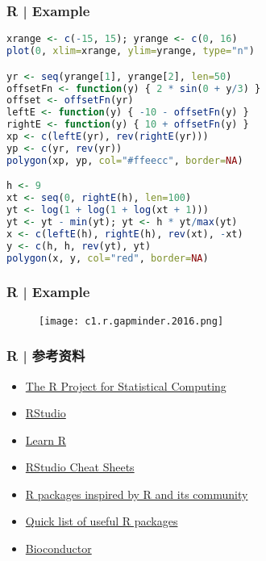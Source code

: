 \begin{frame}[fragile]
  \frametitle{R | Example}
\begin{lstlisting}[language=R,basicstyle=\footnotesize\tt]
xrange <- c(-15, 15); yrange <- c(0, 16)
plot(0, xlim=xrange, ylim=yrange, type="n")

yr <- seq(yrange[1], yrange[2], len=50)
offsetFn <- function(y) { 2 * sin(0 + y/3) }
offset <- offsetFn(yr)
leftE <- function(y) { -10 - offsetFn(y) }
rightE <- function(y) { 10 + offsetFn(y) }
xp <- c(leftE(yr), rev(rightE(yr)))
yp <- c(yr, rev(yr))
polygon(xp, yp, col="#ffeecc", border=NA)

h <- 9
xt <- seq(0, rightE(h), len=100)
yt <- log(1 + log(1 + log(xt + 1)))
yt <- yt - min(yt); yt <- h * yt/max(yt)
x <- c(leftE(h), rightE(h), rev(xt), -xt)
y <- c(h, h, rev(yt), yt)
polygon(x, y, col="red", border=NA)
\end{lstlisting}
\end{frame}

\begin{frame}
  \frametitle{R | Example}
  \begin{figure}
    \centering
    \texttt{[image: c1.r.gapminder.2016.png]}
  \end{figure}
\end{frame}

\begin{frame}
  \frametitle{R | 参考资料}
   \begin{itemize}
     \item \href{https://www.r-project.org/}{The R Project for Statistical Computing}
     \item \href{https://www.rstudio.com/}{RStudio}
     \item \href{https://support.rstudio.com/hc/en-us/categories/200098757-Learn-R}{Learn R}
     \item \href{https://www.rstudio.com/resources/cheatsheets/}{RStudio Cheat Sheets}
     \item \href{https://www.rstudio.com/products/rpackages/}{R packages inspired by R and its community}
     \item \href{https://support.rstudio.com/hc/en-us/articles/201057987-Quick-list-of-useful-R-packages}{Quick list of useful R packages}
     \item \href{https://www.bioconductor.org/}{Bioconductor}
   \end{itemize}
\end{frame}

